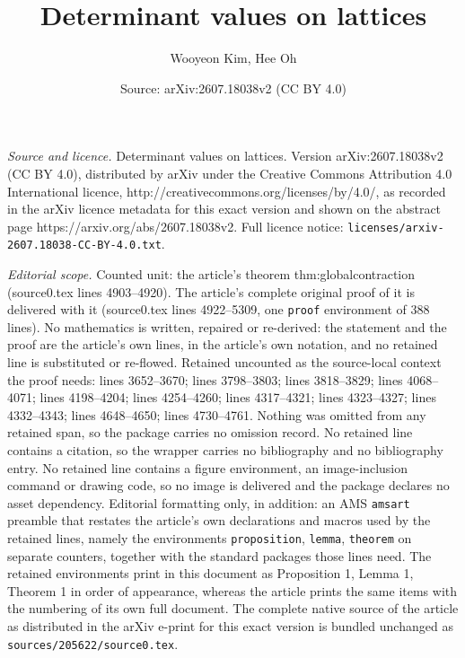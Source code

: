 \documentclass[10pt,a4paper]{amsart}
\title{Determinant values on lattices}
\author{Wooyeon Kim, Hee Oh}
\date{Source: arXiv:2607.18038v2 (CC BY 4.0)}
\begin{document}
\maketitle

\noindent\emph{Source and licence.} Determinant values on lattices. Version arXiv:2607.18038v2 (CC BY 4.0), distributed by arXiv under the Creative Commons Attribution 4.0 International licence, http://creativecommons.org/licenses/by/4.0/, as recorded in the arXiv licence metadata for this exact version and shown on the abstract page https://arxiv.org/abs/2607.18038v2. Full licence notice: \texttt{licenses/arxiv-2607.18038-CC-BY-4.0.txt}.\par\smallskip

\noindent\textit{Editorial scope.} Counted unit: the article's theorem thm:globalcontraction (source0.tex lines 4903--4920). The article's complete original proof of it is delivered with it (source0.tex lines 4922--5309, one \texttt{proof} environment of 388 lines). No mathematics is written, repaired or re-derived: the statement and the proof are the article's own lines, in the article's own notation, and no retained line is substituted or re-flowed.  Retained uncounted as the source-local context the proof needs: lines 3652--3670; lines 3798--3803; lines 3818--3829; lines 4068--4071; lines 4198--4204; lines 4254--4260; lines 4317--4321; lines 4323--4327; lines 4332--4343; lines 4648--4650; lines 4730--4761.  Nothing was omitted from any retained span, so the package carries no omission record.  No retained line contains a citation, so the wrapper carries no bibliography and no bibliography entry.  No retained line contains a figure environment, an image-inclusion command or drawing code, so no image is delivered and the package declares no asset dependency.  Editorial formatting only, in addition: an AMS \texttt{amsart} preamble that restates the article's own declarations and macros used by the retained lines, namely the environments \texttt{proposition}, \texttt{lemma}, \texttt{theorem} on separate counters, together with the standard packages those lines need.  The retained environments print in this document as Proposition 1, Lemma 1, Theorem 1 in order of appearance, whereas the article prints the same items with the numbering of its own full document.  The complete native source of the article as distributed in the arXiv e-print for this exact version is bundled unchanged as \texttt{sources/205622/source0.tex}.
\end{document}
